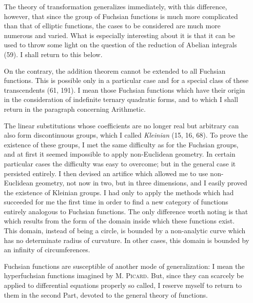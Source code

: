 \documentclass[11pt]{article}
\begin{document}
The theory of transformation generalizes immediately, with this difference, however, that since the group of Fuchsian functions is much more complicated than that of elliptic functions, the cases to be considered are much more numerous and varied. What is especially interesting about it is that it can be used to throw some light on the question of the reduction of Abelian integrals (59). I shall return to this below.

On the contrary, the addition theorem cannot be extended to all Fuchsian functions. This is possible only in a particular case and for a special class of these transcendents (61, 191). I mean those Fuchsian functions which have their origin in the consideration of indefinite ternary quadratic forms, and to which I shall return in the paragraph concerning Arithmetic.

The linear substitutions whose coefficients are no longer real but arbitrary can also form discontinuous groups, which I called \emph{Kleinian} (15, 16, 68). To prove the existence of these groups, I met the same difficulty as for the Fuchsian groups, and at first it seemed impossible to apply non-Euclidean geometry. In certain particular cases the difficulty was easy to overcome; but in the general case it persisted entirely. I then devised an artifice which allowed me to use non-Euclidean geometry, not now in two, but in three dimensions, and I easily proved the existence of Kleinian groups. I had only to apply the methods which had succeeded for me the first time in order to find a new category of functions entirely analogous to Fuchsian functions. The only difference worth noting is that which results from the form of the domain inside which these functions exist. This domain, instead of being a circle, is bounded by a non-analytic curve which has no determinate radius of curvature. In other cases, this domain is bounded by an infinity of circumferences.

Fuchsian functions are susceptible of another mode of generalization: I mean the hyperfuchsian functions imagined by M. \textsc{Picard}. But, since they can scarcely be applied to differential equations properly so called, I reserve myself to return to them in the second Part, devoted to the general theory of functions.
\end{document}
